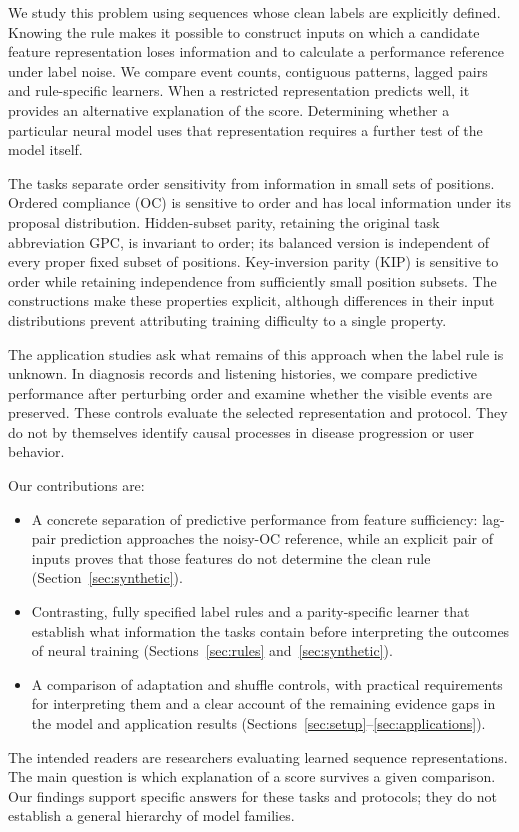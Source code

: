\documentclass[10pt]{article}
\begin{document}
We study this problem using sequences whose clean labels are explicitly defined. Knowing the rule makes it possible to construct inputs on which a candidate feature representation loses information and to calculate a performance reference under label noise. We compare event counts, contiguous patterns, lagged pairs and rule-specific learners. When a restricted representation predicts well, it provides an alternative explanation of the score. Determining whether a particular neural model uses that representation requires a further test of the model itself.

The tasks separate order sensitivity from information in small sets of positions. Ordered compliance (OC) is sensitive to order and has local information under its proposal distribution. Hidden-subset parity, retaining the original task abbreviation GPC, is invariant to order; its balanced version is independent of every proper fixed subset of positions. Key-inversion parity (KIP) is sensitive to order while retaining independence from sufficiently small position subsets. The constructions make these properties explicit, although differences in their input distributions prevent attributing training difficulty to a single property.

The application studies ask what remains of this approach when the label rule is unknown. In diagnosis records and listening histories, we compare predictive performance after perturbing order and examine whether the visible events are preserved. These controls evaluate the selected representation and protocol. They do not by themselves identify causal processes in disease progression or user behavior.

Our contributions are:
\begin{itemize}
\item A concrete separation of predictive performance from feature sufficiency: lag-pair prediction approaches the noisy-OC reference, while an explicit pair of inputs proves that those features do not determine the clean rule (Section~\ref{sec:synthetic}).
\item Contrasting, fully specified label rules and a parity-specific learner that establish what information the tasks contain before interpreting the outcomes of neural training (Sections~\ref{sec:rules} and~\ref{sec:synthetic}).
\item A comparison of adaptation and shuffle controls, with practical requirements for interpreting them and a clear account of the remaining evidence gaps in the model and application results (Sections~\ref{sec:setup}--\ref{sec:applications}).
\end{itemize}
The intended readers are researchers evaluating learned sequence representations. The main question is which explanation of a score survives a given comparison. Our findings support specific answers for these tasks and protocols; they do not establish a general hierarchy of model families.
\end{document}
